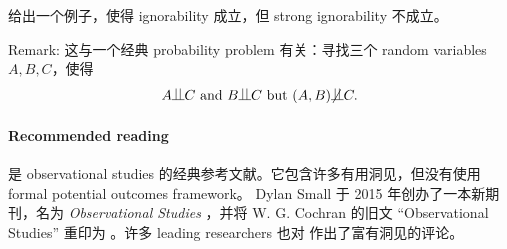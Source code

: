 给出一个例子，使得 ignorability 成立，但 strong ignorability 不成立。 


Remark: 这与一个经典 probability problem 有关：寻找三个 random variables $A,B,C$，使得
$$
A\ind C \text{ and } B\ind C \text{ but } (A,B) \nind C.
$$


\paragraph{Recommended reading}


\citet{cochran1965planning} 是 observational studies 的经典参考文献。它包含许多有用洞见，但没有使用 formal potential outcomes framework。
Dylan Small 于 2015 年创办了一本新期刊，名为 {\it Observational Studies} \citep{small2015introduction}，并将 W. G. Cochran 的旧文 ``Observational Studies'' 重印为 \citet{cochran2015}。许多 leading researchers 也对 \citet{cochran2015} 作出了富有洞见的评论。 
